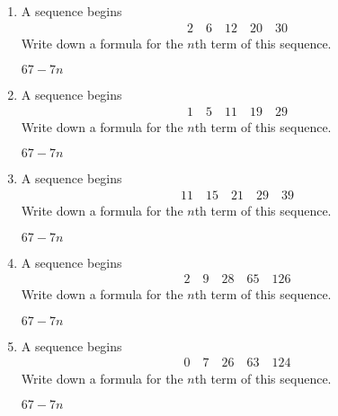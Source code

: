 \begin{enumerate} [leftmargin=0cm]
\item A sequence begins \\
      \begin{align*}
            2  \quad  6  \quad  12  \quad  20  \quad  30 
      \end{align*}       
    Write down a formula for the $n$th term of this sequence.       

    \begin{envAnswer}[blankline=2,text=] $ 67-7n      $ \end{envAnswer}

    
\item A sequence begins \\
      \begin{align*}
            1  \quad  5  \quad  11  \quad  19  \quad  29 
      \end{align*}       
    Write down a formula for the $n$th term of this sequence.       

    \begin{envAnswer}[blankline=2,text=] $ 67-7n      $ \end{envAnswer}




\item A sequence begins \\
      \begin{align*}
            11  \quad  15  \quad  21  \quad  29  \quad  39 
      \end{align*}       
    Write down a formula for the $n$th term of this sequence.       

    \begin{envAnswer}[blankline=2,text=] $ 67-7n      $ \end{envAnswer}








\item A sequence begins \\
      \begin{align*}
            2  \quad  9  \quad  28  \quad  65  \quad  126 
      \end{align*}       
    Write down a formula for the $n$th term of this sequence.       

    \begin{envAnswer}[blankline=2,text=] $ 67-7n      $ \end{envAnswer}


\item A sequence begins \\
      \begin{align*}
            0  \quad  7  \quad  26  \quad  63  \quad  124 
      \end{align*}       
    Write down a formula for the $n$th term of this sequence.       

    \begin{envAnswer}[blankline=2,text=] $ 67-7n      $ \end{envAnswer}
    
\end{enumerate}




